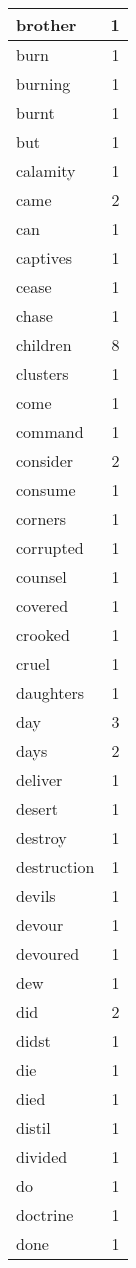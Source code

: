 \begin{center}
\begin{longtable}{l|r}
brother & 1 \\ \hline
burn & 1 \\ \hline
burning & 1 \\ \hline
burnt & 1 \\ \hline
but & 1 \\ \hline
calamity & 1 \\ \hline
came & 2 \\ \hline
can & 1 \\ \hline
captives & 1 \\ \hline
cease & 1 \\ \hline
chase & 1 \\ \hline
children & 8 \\ \hline
clusters & 1 \\ \hline
come & 1 \\ \hline
command & 1 \\ \hline
consider & 2 \\ \hline
consume & 1 \\ \hline
corners & 1 \\ \hline
corrupted & 1 \\ \hline
counsel & 1 \\ \hline
covered & 1 \\ \hline
crooked & 1 \\ \hline
cruel & 1 \\ \hline
daughters & 1 \\ \hline
day & 3 \\ \hline
days & 2 \\ \hline
deliver & 1 \\ \hline
desert & 1 \\ \hline
destroy & 1 \\ \hline
destruction & 1 \\ \hline
devils & 1 \\ \hline
devour & 1 \\ \hline
devoured & 1 \\ \hline
dew & 1 \\ \hline
did & 2 \\ \hline
didst & 1 \\ \hline
die & 1 \\ \hline
died & 1 \\ \hline
distil & 1 \\ \hline
divided & 1 \\ \hline
do & 1 \\ \hline
doctrine & 1 \\ \hline
done & 1 \\ \hline

\end{longtable}
\end{center}
